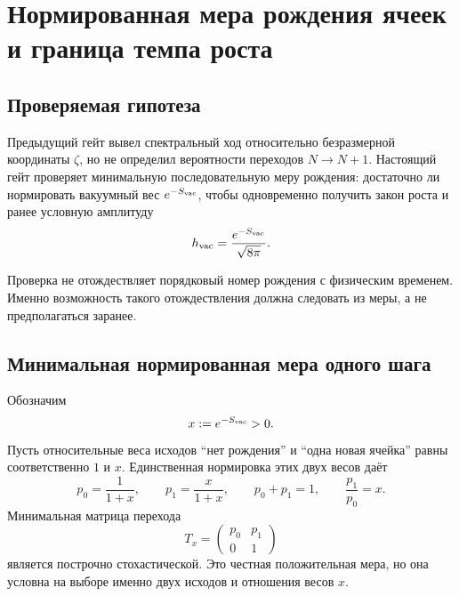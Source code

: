 \chapter{Нормированная мера рождения ячеек и граница темпа роста}
\label{ch:v10-cell-birth-normalized-transition-measure-growth-rate-origin}

\section{Проверяемая гипотеза}

Предыдущий гейт вывел спектральный ход относительно безразмерной координаты
$\zeta$, но не определил вероятности переходов $N\to N+1$. Настоящий гейт
проверяет минимальную последовательную меру рождения: достаточно ли
нормировать вакуумный вес $e^{-S_{\rm vac}}$, чтобы одновременно получить
закон роста и ранее условную амплитуду
\begin{equation}
 h_{\rm vac}=\frac{e^{-S_{\rm vac}}}{\sqrt{8\pi}}.
 \label{eq:v10-birth-target-amplitude}
\end{equation}

Проверка не отождествляет порядковый номер рождения с физическим временем.
Именно возможность такого отождествления должна следовать из меры, а не
предполагаться заранее.

\section{Минимальная нормированная мера одного шага}

Обозначим
\begin{equation}
 x:=e^{-S_{\rm vac}}>0.
 \label{eq:v10-birth-weight}
\end{equation}
Пусть относительные веса исходов ``нет рождения'' и ``одна новая ячейка''
равны соответственно $1$ и $x$. Единственная нормировка этих двух весов
даёт
\begin{equation}
 p_0=\frac1{1+x},
 \qquad
 p_1=\frac{x}{1+x},
 \qquad
 p_0+p_1=1,
 \qquad
 \frac{p_1}{p_0}=x.
 \label{eq:v10-birth-normalized-probabilities}
\end{equation}
Минимальная матрица перехода
\begin{equation}
 T_x=
 \begin{pmatrix}
 p_0&p_1\\0&1
 \end{pmatrix}
 \label{eq:v10-birth-transition-matrix}
\end{equation}
является построчно стохастической. Это честная положительная мера, но она
условна на выборе именно двух исходов и отношения весов $x$.

